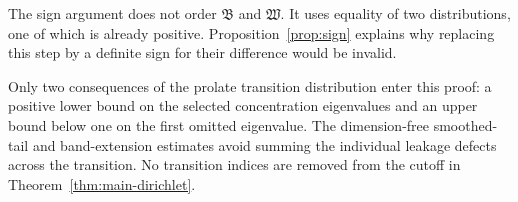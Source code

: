 The sign argument does not order $\mathfrak B$ and $\mathfrak W$.
It uses equality of two distributions, one of which is already
positive. Proposition~\ref{prop:sign} explains why replacing
this step by a definite sign for their difference would be invalid.

Only two consequences of the prolate transition distribution
enter this proof: a positive lower bound on the selected
concentration eigenvalues and an upper bound below one on the
first omitted eigenvalue. The dimension-free smoothed-tail and
band-extension estimates avoid summing the individual leakage
defects across the transition. No transition indices are removed
from the cutoff in Theorem~\ref{thm:main-dirichlet}.
